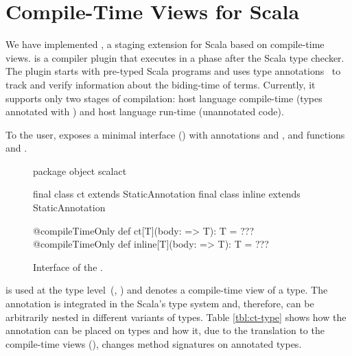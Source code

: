\section{Compile-Time Views for Scala}
\label{sct:interface}

We have implemented \tool, a staging extension for Scala based on compile-time views.
 \tool is a compiler plugin that executes in a phase after the
 Scala type checker. The plugin starts with pre-typed Scala programs and uses
 type annotations~\cite{odersky_1996_putting} to track and verify information about the biding-time
 of terms. Currently, it supports only two stages of compilation: host language compile-time
 (types annotated with ) and host language run-time (unannotated code).

To the user, \tool exposes a minimal interface () with
annotations  and , and functions  and .

\begin{figure}
\begin{listing}
package object scalact {

  final class ct extends StaticAnnotation
  final class inline extends StaticAnnotation

  @compileTimeOnly def ct[T](body: => T): T = ???
  @compileTimeOnly def inline[T](body: => T): T = ???

}
\end{listing}
\label{fig:interface}
\caption{Interface of the \tool.}
\end{figure}

 is used at the type level~(\eg,
) and denotes a compile-time view of a type. The
annotation is integrated in the Scala's type system  and, therefore, can be
arbitrarily nested in different variants of types. Table  \ref{tbl:ct-type}
shows how the  annotation can be placed on types and how it, due to
the translation to the compile-time views (), changes
method signatures on annotated types.


